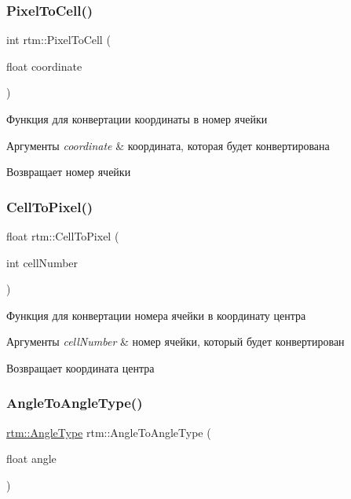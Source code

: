 \subsubsection{\texorpdfstring{Pixel\+To\+Cell()}{PixelToCell()}}
{\footnotesize\ttfamily int rtm\+::\+Pixel\+To\+Cell (\begin{DoxyParamCaption}\item[{float}]{coordinate }\end{DoxyParamCaption})}



Функция для конвертации координаты в номер ячейки 


\begin{DoxyParams}{Аргументы}
{\em coordinate} & координата, которая будет конвертирована \\
\hline
\end{DoxyParams}
\begin{DoxyReturn}{Возвращает}
номер ячейки 
\end{DoxyReturn}
\mbox{\label{namespacertm_af8d63f917ae1055a5766a0ba19542913}} 
\subsubsection{\texorpdfstring{Cell\+To\+Pixel()}{CellToPixel()}}
{\footnotesize\ttfamily float rtm\+::\+Cell\+To\+Pixel (\begin{DoxyParamCaption}\item[{int}]{cell\+Number }\end{DoxyParamCaption})}



Функция для конвертации номера ячейки в координату центра 


\begin{DoxyParams}{Аргументы}
{\em cell\+Number} & номер ячейки, который будет конвертирован \\
\hline
\end{DoxyParams}
\begin{DoxyReturn}{Возвращает}
координата центра 
\end{DoxyReturn}
\mbox{\label{namespacertm_aea5ae6d368199e41611725e0db13c5c3}} 
\subsubsection{\texorpdfstring{Angle\+To\+Angle\+Type()}{AngleToAngleType()}}
{\footnotesize\ttfamily \hyperlink{namespacertm_a69dc82b16a0148c10962caa83d930f89}{rtm\+::\+Angle\+Type} rtm\+::\+Angle\+To\+Angle\+Type (\begin{DoxyParamCaption}\item[{float}]{angle }\end{DoxyParamCaption})}



